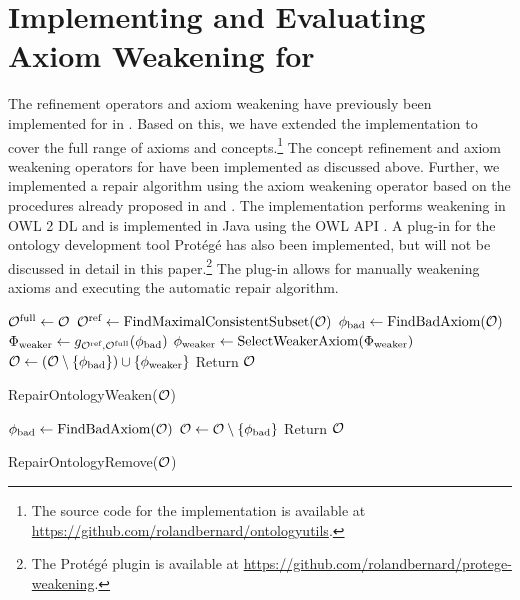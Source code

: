 \documentclass[
]{ceurart}
\begin{document}
\section{Implementing and Evaluating Axiom Weakening for \SROIQ}

The refinement operators and axiom weakening have previously been implemented for \ALC in \cite{troquard2018repairing}. Based on this, we have extended the implementation to cover the full range of \SROIQ axioms and concepts.\footnote{The source code for the implementation is available at \url{https://github.com/rolandbernard/ontologyutils}.} The concept refinement and axiom weakening operators for \SROIQ have been implemented as discussed above. Further, we implemented a repair algorithm using the axiom weakening operator based on the procedures already proposed in \cite{troquard2018repairing} and \cite{confalonieri2020towards}. The implementation performs weakening in OWL 2 DL \cite{motik2012ontology} and is implemented in Java using the OWL API \cite{horridge2011owl}. A plug-in for the ontology development tool Protégé has also been implemented, but will not be discussed in detail in this paper.\footnote{The Protégé plugin is available at \url{https://github.com/rolandbernard/protege-weakening}.} The plug-in allows for manually weakening axioms and executing the automatic repair algorithm.

\noindent
\begin{minipage}[t]{.5\textwidth}
  \begin{algorithm}[H]
    \footnotesize
    \begin{algorithmic}
      \State ${\mathcal{O}^\textnormal{full}} \gets \mathcal{O}$
      \State ${\mathcal{O}^\textnormal{ref}} \gets \textnormal{FindMaximalConsistentSubset(\ensuremath{\mathcal{O}})}$
        \State $\phi_\textnormal{bad} \gets \textnormal{FindBadAxiom}(\mathcal{O})$
        \State $\Phi_\textnormal{weaker} \gets g_{{\mathcal{O}^\textnormal{ref}},{\mathcal{O}^\textnormal{full}}}(\phi_\textnormal{bad})$
        \State $\phi_\textnormal{weaker} \gets \textnormal{SelectWeakerAxiom}(\Phi_\textnormal{weaker})$
        \State $\mathcal{O} \gets (\mathcal{O} \setminus \{\phi_\textnormal{bad}\}) \cup \{\phi_\textnormal{weaker}\}$
      \EndWhile
      \State Return $\mathcal{O}$
    \end{algorithmic}
    \caption{RepairOntologyWeaken($\mathcal{O}$)}
    \label{algo:repair-weaken}
  \end{algorithm}
\end{minipage}
\hfill
\begin{minipage}[t]{.45\textwidth}
  \begin{algorithm}[H]
    \footnotesize
    \begin{algorithmic}
        \State $\phi_\textnormal{bad} \gets \textnormal{FindBadAxiom}(\mathcal{O})$
        \State $\mathcal{O} \gets \mathcal{O} \setminus \{\phi_\textnormal{bad}\}$
      \EndWhile
      \State Return $\mathcal{O}$
    \end{algorithmic}
    \caption{RepairOntologyRemove($\mathcal{O}$)}
    \label{algo:repair-remove}
  \end{algorithm}
\end{minipage}
\vskip 8mm
\end{document}
